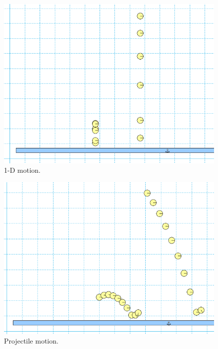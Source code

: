 %
\begin{figure}[H]
\centering
\includegraphics[scale=0.35]{figures/projectileMotion/fig2.png}
\caption{1-D motion.}
\label{fig:fig2}
\end{figure}
%
\begin{figure}[H]
\centering
\includegraphics[scale=0.35]{figures/projectileMotion/fig3.png}
\caption{Projectile motion.}
\label{fig:fig3}
\end{figure}


